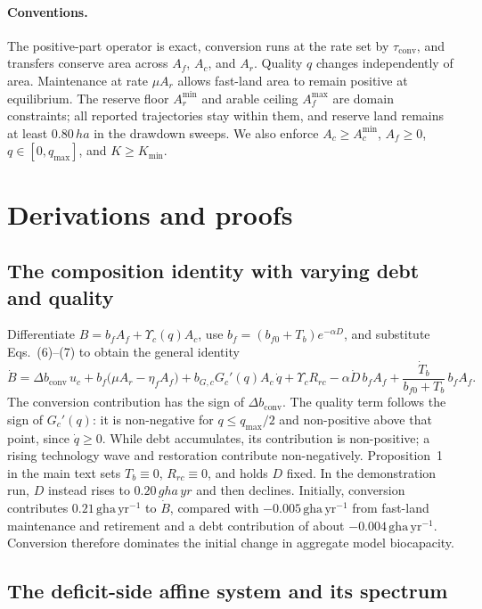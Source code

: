 \documentclass[11pt,a4paper]{article}
\newcommand{\dconv}{\Delta b_{\mathrm{conv}}}
\newcommand{\Ups}{\Upsilon_c}
\newcommand{\Acmin}{A_c^{\min}}
\newcommand{\tconv}{\tau_{\mathrm{conv}}}
\begin{document}
\paragraph{Conventions.} The positive-part operator is exact, conversion runs at the rate set by $\tconv$, and transfers conserve area across $A_f$, $A_c$, and $A_r$. Quality $q$ changes independently of area. Maintenance at rate $\mu A_r$ allows fast-land area to remain positive at equilibrium. The reserve floor $A_r^{\min}$ and arable ceiling $A_f^{\max}$ are domain constraints; all reported trajectories stay within them, and reserve land remains at least $0.80\,ha$ in the drawdown sweeps. We also enforce $A_c\ge\Acmin$, $A_f\ge0$, $q\in[0,q_{\max}]$, and $K\ge K_{\min}$.

\section{Derivations and proofs}\label{si:proofs}

\subsection{The composition identity with varying debt and quality}\label{si:identity}

Differentiate $B=b_fA_f+\Ups(q)A_c$, use $b_f=(b_{f0}+T_b)e^{-\alpha D}$, and substitute Eqs.~(6)--(7) to obtain the general identity
\begin{equation}\label{eq:si_identity}
\dot B=\dconv\,u_c+b_f\big(\mu A_r-\eta_fA_f\big)+b_{G,c}G_c'(q)A_c\,\dot q+\Ups R_{rc}-\alpha\dot D\,b_fA_f+\frac{\dot T_b}{b_{f0}+T_b}\,b_fA_f .
\end{equation}
The conversion contribution has the sign of $\dconv$. The quality term follows the sign of $G_c'(q)$: it is non-negative for $q\le q_{\max}/2$ and non-positive above that point, since $\dot q\ge0$. While debt accumulates, its contribution is non-positive; a rising technology wave and restoration contribute non-negatively. Proposition~1 in the main text sets $T_b\equiv0$, $R_{rc}\equiv0$, and holds $D$ fixed. In the demonstration run, $D$ instead rises to $0.20\,gha\,yr$ and then declines. Initially, conversion contributes $0.21\,\mathrm{gha\,yr^{-1}}$ to $\dot B$, compared with $-0.005\,\mathrm{gha\,yr^{-1}}$ from fast-land maintenance and retirement and a debt contribution of about $-0.004\,\mathrm{gha\,yr^{-1}}$. Conversion therefore dominates the initial change in aggregate model biocapacity.

\subsection{The deficit-side affine system and its spectrum}\label{si:affine}
\end{document}
